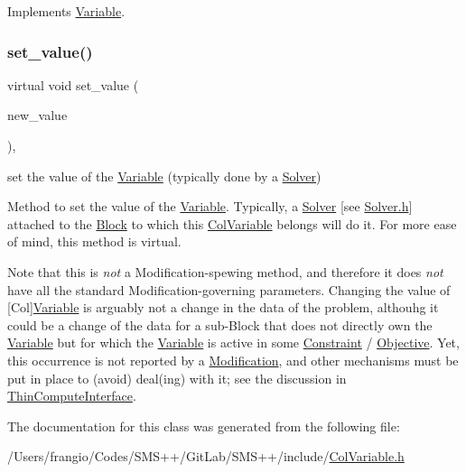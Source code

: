 Implements \mbox{\hyperlink{class_s_m_spp__di__unipi__it_1_1_variable_af5d1aa1e79219b323968cf33d689f474}{Variable}}.

\mbox{\label{class_s_m_spp__di__unipi__it_1_1_col_variable_a563c1c2ac668d64ccd46176cc6e38ab8}} 
\subsubsection{\texorpdfstring{set\+\_\+value()}{set\_value()}}
{\footnotesize\ttfamily virtual void set\+\_\+value (\begin{DoxyParamCaption}\item[{\mbox{\hyperlink{class_s_m_spp__di__unipi__it_1_1_col_variable_aa51e8c6ea70ce11b2c28485c5d9f3ed0}{c\+\_\+\+Var\+Value}}}]{new\+\_\+value }\end{DoxyParamCaption})\hspace{0.3cm}{\ttfamily [inline]}, {\ttfamily [virtual]}}



set the value of the \mbox{\hyperlink{class_s_m_spp__di__unipi__it_1_1_variable}{Variable}} (typically done by a \mbox{\hyperlink{class_s_m_spp__di__unipi__it_1_1_solver}{Solver}}) 

Method to set the value of the \mbox{\hyperlink{class_s_m_spp__di__unipi__it_1_1_variable}{Variable}}. Typically, a \mbox{\hyperlink{class_s_m_spp__di__unipi__it_1_1_solver}{Solver}} \mbox{[}see \mbox{\hyperlink{_solver_8h}{Solver.\+h}}\mbox{]} attached to the \mbox{\hyperlink{class_s_m_spp__di__unipi__it_1_1_block}{Block}} to which this \mbox{\hyperlink{class_s_m_spp__di__unipi__it_1_1_col_variable}{Col\+Variable}} belongs will do it. For more ease of mind, this method is virtual.

Note that this is {\itshape not} a Modification-\/spewing method, and therefore it does {\itshape not} have all the standard Modification-\/governing parameters. Changing the value of \mbox{[}Col\mbox{]}\mbox{\hyperlink{class_s_m_spp__di__unipi__it_1_1_variable}{Variable}} is arguably not a change in the data of the problem, althouhg it could be a change of the data for a sub-\/\+Block that does not directly own the \mbox{\hyperlink{class_s_m_spp__di__unipi__it_1_1_variable}{Variable}} but for which the \mbox{\hyperlink{class_s_m_spp__di__unipi__it_1_1_variable}{Variable}} is active in some \mbox{\hyperlink{class_s_m_spp__di__unipi__it_1_1_constraint}{Constraint}} / \mbox{\hyperlink{class_s_m_spp__di__unipi__it_1_1_objective}{Objective}}. Yet, this occurrence is not reported by a \mbox{\hyperlink{class_s_m_spp__di__unipi__it_1_1_modification}{Modification}}, and other mechanisms must be put in place to (avoid) deal(ing) with it; see the discussion in \mbox{\hyperlink{class_s_m_spp__di__unipi__it_1_1_thin_compute_interface}{Thin\+Compute\+Interface}}. 

The documentation for this class was generated from the following file\+:\begin{DoxyCompactItemize}
\item 
/\+Users/frangio/\+Codes/\+S\+M\+S++/\+Git\+Lab/\+S\+M\+S++/include/\mbox{\hyperlink{_col_variable_8h}{Col\+Variable.\+h}}\end{DoxyCompactItemize}
